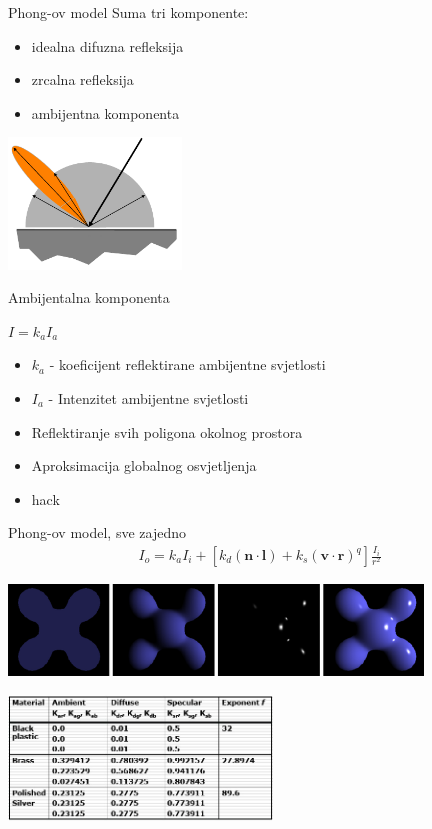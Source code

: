 \documentclass[9pt]{beamer}
\begin{document}
\begin{frame}{Phong-ov model}
	Suma tri komponente:
	\begin{itemize}
		\item idealna difuzna refleksija
		\item zrcalna refleksija
		\item ambijentna komponenta
	\end{itemize}
	\begin{center}
		\includegraphics[height=3.5cm]{slike/phong_model_complete.png}
	\end{center}
\end{frame}
\begin{frame}{Ambijentalna komponenta}
	\begin{block}{}
		$I = k_{a}I_{a}$
		\begin{itemize}
			\item $k_{a}$ - koeficijent reflektirane ambijentne svjetlosti
			\item $I_{a}$ - Intenzitet ambijentne svjetlosti
		\end{itemize}
	\end{block}
	\begin{itemize}
		\item Reflektiranje svih poligona okolnog prostora
		\item Aproksimacija globalnog osvjetljenja
		\item hack
	\end{itemize}
\end{frame}

\begin{frame}{Phong-ov model, sve zajedno}
	\begin{align*}
	I_o = k_aI_i + \left[k_d\left(\mathbf{n}\cdot\mathbf{l}\right)+
	k_s\left(\mathbf{v}\cdot\mathbf{r}\right)^q\right]\frac{I_i}{r^2}
	\end{align*}
	\begin{center}
		\includegraphics[width=11cm]{slike/phong_reflection.png}
		\bigskip
		
		\includegraphics[width=7cm]{slike/phong_constants.png}
	\end{center}
	
\end{frame}
\end{document}
